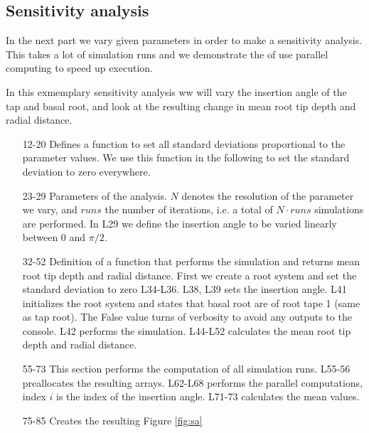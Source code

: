 \documentclass[a4paper]{article}
\begin{document}
\subsection{Sensitivity analysis} \label{sec:sa}

In the next part we vary given parameters in order to make a sensitivity analysis. This takes a lot of simulation runs and we demonstrate the of use parallel computing to speed up execution.

In this exmemplary sensitivity analysis ww will vary the insertion angle of the tap and basal root, and look at the resulting change in mean root tip depth and radial distance. 



\begin{itemize}

\item[12-20] Defines a function to set all standard deviations proportional to the parameter values. We use this function in the following to set the standard deviation to zero everywhere. 

\item[23-29] Parameters of the analysis. $N$ denotes the resolution of the parameter we vary, and $runs$ the number of iterations, i.e. a total of $N\cdot runs$ simulations are performed. In L29 we define the insertion angle to be varied linearly between 0 and $\pi/2$.

\item[32-52] Definition of a function that performs the simulation and returns mean root tip depth and radial distance. First we create a root system and set the standard deviation to zero L34-L36. L38, L39 sets the insertion angle. L41 initializes the root system and states that basal root are of root tape 1 (same as tap root). The False value turns of verbosity to avoid any outputs to the console. L42 performs the simulation. L44-L52 calculates the mean root tip depth and radial distance. 

\item[55-73] This section performs the computation of all simulation runs. L55-56 preallocates the resulting arrays. L62-L68 performs the parallel computations, index $i$ is the index of the insertion angle. L71-73 calculates the mean values.

\item[75-85] Creates the resulting Figure \ref{fig:sa}

\end{itemize}
\end{document}
